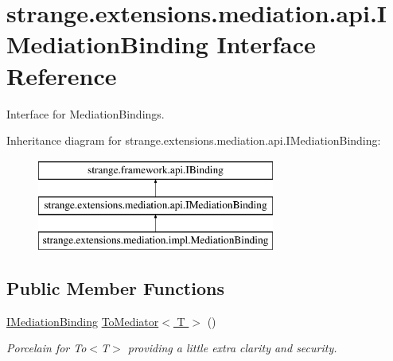 \hypertarget{interfacestrange_1_1extensions_1_1mediation_1_1api_1_1_i_mediation_binding}{\section{strange.\-extensions.\-mediation.\-api.\-I\-Mediation\-Binding Interface Reference}
\label{interfacestrange_1_1extensions_1_1mediation_1_1api_1_1_i_mediation_binding}
}


Interface for Mediation\-Bindings.  


Inheritance diagram for strange.\-extensions.\-mediation.\-api.\-I\-Mediation\-Binding\-:\begin{figure}[H]
\begin{center}
\leavevmode
\includegraphics[height=3.000000cm]{interfacestrange_1_1extensions_1_1mediation_1_1api_1_1_i_mediation_binding}
\end{center}
\end{figure}
\subsection*{Public Member Functions}
\begin{DoxyCompactItemize}
\item 
\hypertarget{interfacestrange_1_1extensions_1_1mediation_1_1api_1_1_i_mediation_binding_a951dcbba87301560b8f6243ad597c175}{\hyperlink{interfacestrange_1_1extensions_1_1mediation_1_1api_1_1_i_mediation_binding}{I\-Mediation\-Binding} \hyperlink{interfacestrange_1_1extensions_1_1mediation_1_1api_1_1_i_mediation_binding_a951dcbba87301560b8f6243ad597c175}{To\-Mediator$<$ T $>$} ()}\label{interfacestrange_1_1extensions_1_1mediation_1_1api_1_1_i_mediation_binding_a951dcbba87301560b8f6243ad597c175}

\begin{DoxyCompactList}\small\item\em Porcelain for To$<$\-T$>$ providing a little extra clarity and security. \end{DoxyCompactList}\end{DoxyCompactItemize}
